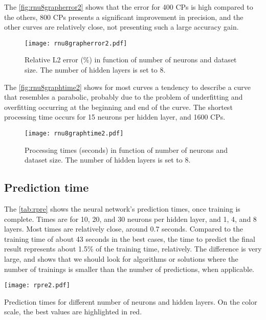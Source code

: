 \documentclass[conference]{IEEEtran}
\begin{document}
The \autoref{fig:rnu8grapherror2} shows that the error for 400 CPs is high compared to the others, 800 CPs presents a significant improvement in precision, and the other curves are relatively close, not presenting such a large accuracy gain.

\begin{figure}[htb]
	\centering
	\texttt{[image: rnu8grapherror2.pdf]}
	\caption{Relative L2 error (\%) in function of number of neurons and dataset size. The number of hidden layers is set to 8.}
	\label{fig:rnu8grapherror2}
\end{figure}

The \autoref{fig:rnu8graphtime2} shows for most curves a tendency to describe a curve that resembles a parabolic, probably due to the problem of underfitting and overfitting occurring at the beginning and end of the curve. The shortest processing time occurs for 15 neurons per hidden layer, and 1600 CPs.

\begin{figure}[htb]
	\centering
	\texttt{[image: rnu8graphtime2.pdf]}
	\caption{Processing times (seconds) in function of number of neurons and dataset size. The number of hidden layers is set to 8.}
	\label{fig:rnu8graphtime2}
\end{figure}

\subsection{Prediction time}

The \autoref{tab:rpre} shows the neural network's prediction times, once training is complete. Times are for 10, 20, and 30 neurons per hidden layer, and 1, 4, and 8 layers. Most times are relatively close, around 0.7 seconds. Compared to the training time of about 43 seconds in the best cases, the time to predict the final result represents about 1.5\% of the training time, relatively. The difference is very large, and shows that we should look for algorithms or solutions where the number of trainings is smaller than the number of predictions, when  applicable.

\begin{table}[htb]
	\centering
	\texttt{[image: rpre2.pdf]}
	\caption{Prediction times for different number of neurons and hidden layers. On the color scale, the best values are highlighted in red.}
	\label{tab:rpre}
\end{table}
\end{document}
